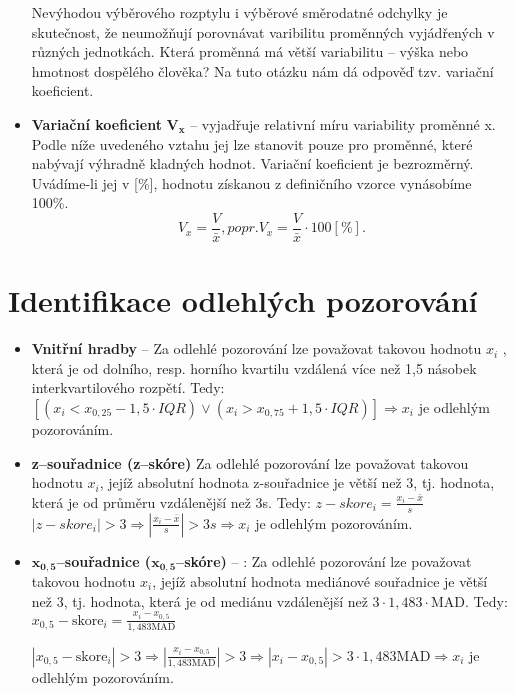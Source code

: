 \begin{itemize}
          Nevýhodou výběrového rozptylu i výběrové směrodatné odchylky je skutečnost, že neumožňují porovnávat varibilitu proměnných vyjádřených v různých jednotkách. Která proměnná má větší variabilitu – výška nebo hmotnost dospělého člověka? Na tuto otázku nám dá odpověď tzv. variační koeficient.
    \item \textbf{Variační koeficient} $\mathbf{V_x}$ -- vyjadřuje relativní míru variability proměnné x. Podle níže uvedeného vztahu jej lze stanovit pouze pro proměnné, které nabývají výhradně kladných hodnot. Variační koeficient je bezrozměrný. Uvádíme-li jej v [\%], hodnotu získanou z definičního vzorce vynásobíme 100\%.
          \begin{equation*}
              V_x = \frac{V}{\bar{x}}, popr. V_x = \frac{V}{\bar{x}} \cdot 100 [\%].
          \end{equation*}
\end{itemize}

\section{Identifikace odlehlých pozorování}
\begin{itemize}
    \item \textbf{Vnitřní hradby} -- Za odlehlé pozorování lze považovat takovou hodnotu $x_i$ , která je od dolního, resp. horního kvartilu vzdálená více než 1,5 násobek interkvartilového rozpětí. Tedy: $[(x_i < x_{0,25} - 1,5 \cdot IQR) \vee (x_i > x_{0,75} + 1,5 \cdot IQR)] \Rightarrow x_i$ je odlehlým pozorováním.
    \item \textbf{z--souřadnice (z--skóre)} Za odlehlé pozorování lze považovat takovou hodnotu $x_i$, jejíž absolutní hodnota z-souřadnice je větší než 3, tj. hodnota, která je od průměru vzdálenější než 3s. Tedy: $z-skore_i = \frac{x_i - \bar{x}}{s}$ \\
          $|z-skore_i| > 3 \Rightarrow |\frac{x_i - \bar{x}}{s}| >3s \Rightarrow x_i$ je odlehlým pozorováním.

    \item $\mathbf{x_{0,5}}$\textbf{--souřadnice ($\mathbf{x_{0,5}}$--skóre)} -- : Za odlehlé pozorování lze považovat takovou hodnotu $x_i$, jejíž absolutní hodnota mediánové souřadnice je větší než 3, tj. hodnota, která je od mediánu vzdálenější než $3 \cdot 1,483\cdot \textrm{MAD}$. Tedy: $x_{0,5}-\textrm{skore}_i = \frac{x_i - x_{0,5}}{1,483\textrm{MAD}}$

          $|x_{0,5}-\textrm{skore}_i| > 3 \Rightarrow |\frac{x_i - x_{0,5}}{1,483\textrm{MAD}}| >3 \Rightarrow |x_i - x_{0,5}| >3 \cdot 1,483\textrm{MAD} \Rightarrow x_i$ je odlehlým pozorováním.
\end{itemize}

